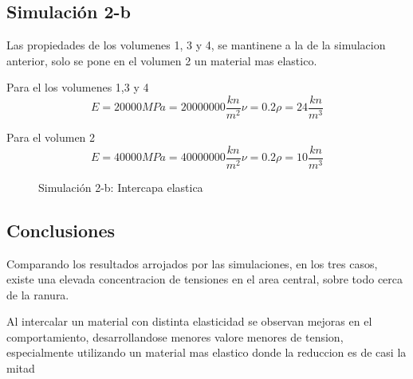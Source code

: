 \documentclass[12pt, a4paper]{article}
\begin{document}
\subsection{Simulación 2-b}

Las propiedades de los volumenes 1, 3 y 4, se mantinene a la de la simulacion anterior, solo se pone en el volumen 2 un material mas elastico.

Para el los volumenes 1,3 y 4
\begin{equation*}
	E=20000 MPa = 20000000 \frac{kn}{m^2}
	\nu = 0.2
	\rho = 24 \frac{kn}{m^3}
\end{equation*}

Para el volumen 2
\begin{equation*}
	E=40000 MPa = 40000000 \frac{kn}{m^2}
	\nu = 0.2
	\rho = 10 \frac{kn}{m^3}
\end{equation*}

\begin{figure}[h]
	\centering
	\caption{Simulación 2-b: Intercapa elastica}
\end{figure}

\subsection{Conclusiones}


Comparando los resultados arrojados por las simulaciones, en los tres casos, existe una elevada concentracion de tensiones en el area central, sobre todo cerca de la ranura.

Al intercalar un material con distinta elasticidad se observan mejoras en el comportamiento, desarrollandose menores valore menores de tension, especialmente utilizando un material mas elastico donde la reduccion es de casi la mitad
\end{document}
